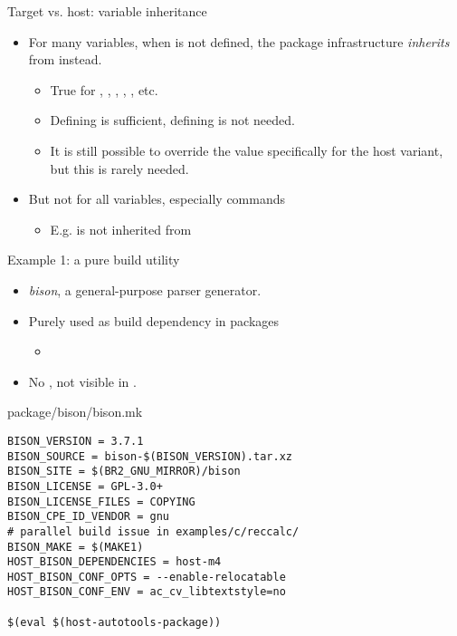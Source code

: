 \begin{frame}{Target vs. host: variable inheritance}
  \begin{itemize}
  \item For many variables, when  is not defined,
    the package infrastructure {\em inherits} from 
    instead.
    \begin{itemize}
    \item True for , ,
      , ,
      , etc.
    \item Defining  is sufficient, defining
       is not needed.
    \item It is still possible to override the value specifically for
      the host variant, but this is rarely needed.
    \end{itemize}
  \item But not for all variables, especially commands
    \begin{itemize}
    \item E.g.  is not inherited
      from 
    \end{itemize}
  \end{itemize}
\end{frame}

\begin{frame}[fragile]{Example 1: a pure build utility}
  \begin{itemize}
  \item {\em bison}, a general-purpose parser generator.
  \item Purely used as build dependency in packages
    \begin{itemize}
    \item {}
    \end{itemize}
  \item No , not visible in .
  \end{itemize}
  \begin{block}{package/bison/bison.mk}
\begin{verbatim}
BISON_VERSION = 3.7.1
BISON_SOURCE = bison-$(BISON_VERSION).tar.xz
BISON_SITE = $(BR2_GNU_MIRROR)/bison
BISON_LICENSE = GPL-3.0+
BISON_LICENSE_FILES = COPYING
BISON_CPE_ID_VENDOR = gnu
# parallel build issue in examples/c/reccalc/
BISON_MAKE = $(MAKE1)
HOST_BISON_DEPENDENCIES = host-m4
HOST_BISON_CONF_OPTS = --enable-relocatable
HOST_BISON_CONF_ENV = ac_cv_libtextstyle=no

$(eval $(host-autotools-package))
\end{verbatim}
  \end{block}
\end{frame}

